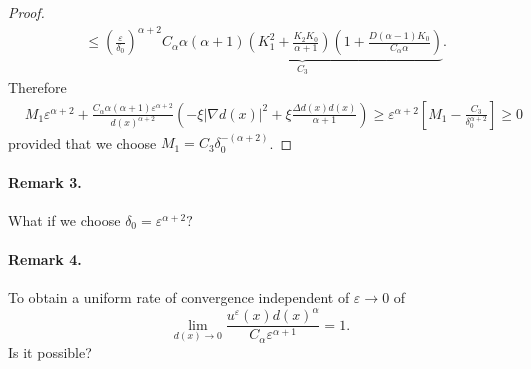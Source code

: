 \documentclass[10pt]{article}
\theoremstyle{plain}
\theoremstyle{remark}
\begin{document}
\begin{proof}
\begin{equation*}
\begin{split}
    &\leq \left(\frac{\varepsilon}{\delta_0}\right)^{\alpha+2} \underbrace{C_\alpha\alpha(\alpha+1)\left(K_1^2+\frac{K_2K_0}{\alpha+1}\right)\left(1+\frac{D(\alpha-1)K_0}{C_\alpha\alpha}\right)}_{C_3}.
\end{split}
\end{equation*}
Therefore
\begin{equation*}
    \begin{split}
        &M_1\varepsilon^{\alpha+2} + \frac{C_\alpha\alpha(\alpha+1)\varepsilon^{\alpha+2}}{d(x)^{\alpha+2}}\left(-\xi|\nabla d(x)|^{2} + \xi \frac{\Delta d(x)d(x)}{\alpha+1}\right)\geq \varepsilon^{\alpha+2}\left[M_1 - \frac{C_3}{\delta_0^{\alpha+2}}\right] \geq 0
    \end{split}
\end{equation*}
provided that we choose $M_1 = C_3\delta_0^{-(\alpha+2)}$.
\end{proof}

\paragraph{Remark 3.} What if we choose $\delta_0 = \varepsilon^{\alpha+2}?$ 

\paragraph{Remark 4.} To obtain a uniform rate of convergence independent of $\varepsilon\to 0$ of
\begin{equation*}
    \lim_{d(x)\to 0} \frac{u^\varepsilon(x)d(x)^\alpha}{C_\alpha \varepsilon^{\alpha+1}} = 1.
\end{equation*}
Is it possible?
\end{document}

